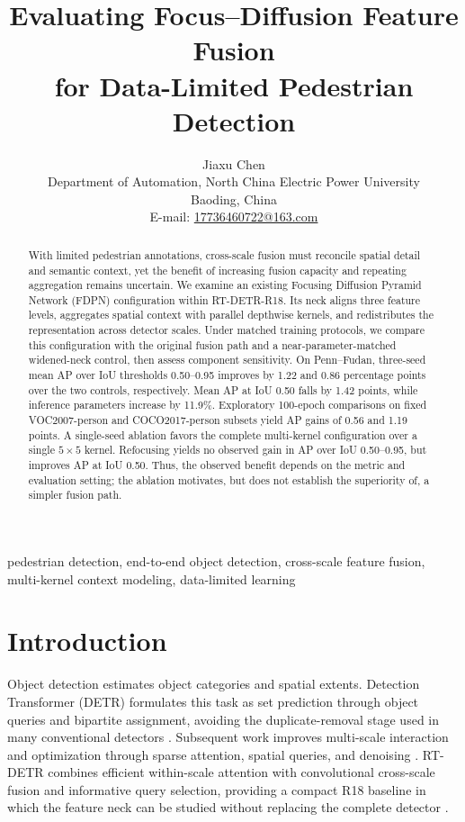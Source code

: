 \documentclass[journal]{IEEEtran}
\title{Evaluating Focus--Diffusion Feature Fusion\\for Data-Limited Pedestrian Detection}
\author{Jiaxu Chen\\[0.35em]
{\normalfont\small Department of Automation, North China Electric Power University}\\[-0.1em]
{\normalfont\small Baoding, China}\\[-0.1em]
{\normalfont\small E-mail: \href{mailto:17736460722@163.com}{17736460722@163.com}}}
\begin{document}
\raggedbottom
\maketitle
\thispagestyle{projectfirst}

\begin{abstract}
With limited pedestrian annotations, cross-scale fusion must reconcile spatial detail and semantic context, yet the benefit of increasing fusion capacity and repeating aggregation remains uncertain. We examine an existing Focusing Diffusion Pyramid Network (FDPN) configuration within RT-DETR-R18. Its neck aligns three feature levels, aggregates spatial context with parallel depthwise kernels, and redistributes the representation across detector scales. Under matched training protocols, we compare this configuration with the original fusion path and a near-parameter-matched widened-neck control, then assess component sensitivity. On Penn--Fudan, three-seed mean AP over IoU thresholds 0.50--0.95 improves by 1.22 and 0.86 percentage points over the two controls, respectively. Mean AP at IoU 0.50 falls by 1.42 points, while inference parameters increase by 11.9\%. Exploratory 100-epoch comparisons on fixed VOC2007-person and COCO2017-person subsets yield AP gains of 0.56 and 1.19 points. A single-seed ablation favors the complete multi-kernel configuration over a single $5\times5$ kernel. Refocusing yields no observed gain in AP over IoU 0.50--0.95, but improves AP at IoU 0.50. Thus, the observed benefit depends on the metric and evaluation setting; the ablation motivates, but does not establish the superiority of, a simpler fusion path.
\end{abstract}

\begin{IEEEkeywords}
pedestrian detection, end-to-end object detection, cross-scale feature fusion, multi-kernel context modeling, data-limited learning
\end{IEEEkeywords}

\section{Introduction}
Object detection estimates object categories and spatial extents. Detection Transformer (DETR) formulates this task as set prediction through object queries and bipartite assignment, avoiding the duplicate-removal stage used in many conventional detectors \cite{carion2020detr,vaswani2017attention}. Subsequent work improves multi-scale interaction and optimization through sparse attention, spatial queries, and denoising \cite{zhu2021deformable,liu2022dab,zhang2023dino}. RT-DETR combines efficient within-scale attention with convolutional cross-scale fusion and informative query selection, providing a compact R18 baseline in which the feature neck can be studied without replacing the complete detector \cite{zhao2024rtdetr}.
\end{document}
